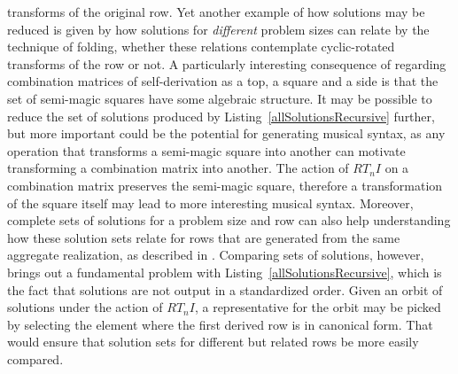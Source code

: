 transforms of the original row. Yet another example of how solutions may be reduced is given by how solutions for \emph{different} problem sizes can relate by the technique of folding, whether these relations contemplate cyclic-rotated transforms of the row or not. A particularly interesting consequence of regarding combination matrices of self-derivation as a top, a square and a side is that the set of semi-magic squares have some algebraic structure. It may be possible to reduce the set of solutions produced by Listing~\ref{allSolutionsRecursive} further, but more important could be the potential for generating musical syntax, as any operation that transforms a semi-magic square into another can motivate transforming a combination matrix into another. The action of $RT_nI$ on a combination matrix preserves the semi-magic square, therefore a transformation of the square itself may lead to more interesting musical syntax. Moreover, complete sets of solutions for a problem size and row can also help understanding how these solution sets relate for rows that are generated from the same aggregate realization, as described in \cite{Starr1984}. Comparing sets of solutions, however, brings out a fundamental problem with Listing~\ref{allSolutionsRecursive}, which is the fact that solutions are not output in a standardized order. Given an orbit of solutions under the action of $RT_nI$, a representative for the orbit may be picked by selecting the element where the first derived row is in canonical form. That would ensure that solution sets for different but related rows be more easily compared.

